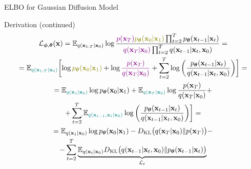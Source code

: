 \documentclass{beamer}
\renewcommand{\nextonslide}[1]{#1}
\begin{document}
\begin{frame}{ELBO for Gaussian Diffusion Model}
    \begin{block}{Derivation (continued)}
        \vspace{-0.7cm}
        {\small
        \begin{multline*}
            \cL_{\bphi, \btheta}(\bx) = \bbE_{q(\bx_{1:T} | \bx_0)} \log \frac{{\color{violet}p(\bx_T)} {\color{olive}\pt(\bx_0 | \bx_1)} \prod_{t=2}^T \pt(\bx_{t-1} | \bx_t) }{{\color{violet}q(\bx_T | \bx_0)}\prod_{t=2}^T q(\bx_{t-1}|\bx_t, \bx_0)} 
            \nextonslide{ = \\ = \bbE_{{\color{teal}q(\bx_{1:T} | \bx_0)}} \biggl[ \log {\color{olive}\pt(\bx_0 | \bx_1)} + \log {\color{violet}\frac{p(\bx_T)}{q(\bx_T | \bx_0)}} + \sum_{t=2}^T \log \left( \frac{\pt(\bx_{t-1} | \bx_t)}{q(\bx_{t-1}|\bx_{t}, \bx_0)}\right) \biggr] }
            \nextonslide{= \\ = \bbE_{{\color{teal}q(\bx_1 | \bx_0)}} \log \pt(\bx_0 | \bx_1) + \bbE_{{\color{teal}q(\bx_T | \bx_0)}} \log \frac{p(\bx_T)}{q(\bx_T | \bx_0)} + \\
             + \sum_{t=2}^T \bbE_{{\color{teal}q(\bx_{t-1}, \bx_t | \bx_0)}} \log \left( \frac{\pt(\bx_{t-1} | \bx_t)}{q(\bx_{t-1}|\bx_{t}, \bx_0)}\right) \biggr] }
            \nextonslide{= \\ = \bbE_{q(\bx_1 | \bx_0)} \log \pt(\bx_0 | \bx_1) - \KL\bigl(q(\bx_T | \bx_0) \| p(\bx_T)\bigr) - \\
            - \sum_{t=2}^T \underbrace{ \bbE_{q(\bx_t | \bx_0)} \KL \bigl(q(\bx_{t-1} | \bx_t, \bx_0) \| \pt(\bx_{t-1} | \bx_t)\bigr)}_{\cL_t}}
        \end{multline*}
        }
        \vspace{-0.3cm}
    \end{block}
\end{frame}
\end{document}
